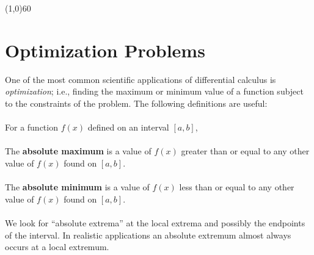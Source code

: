 \documentclass[10.5pt,twoside]{report}
\theoremstyle{definition}
\begin{document}
\line(1,0){60}
\linethickness{0.5mm}

\pagebreak





\section{Optimization Problems}\label{Optimization Problems}

One of the most common scientific applications of differential calculus is \textit{optimization}; i.e., finding the maximum or minimum value of a function subject to the constraints of the problem.  The following definitions are useful:\\
${}$\\
For a function $f(x)$ defined on an interval $[a,b]$,\\
\verb|   |\\
The \textbf{absolute maximum} is a value of $f(x)$ greater than or equal to any other value of $f(x)$ found on $[a,b]$.\\
\verb|   |\\
The \textbf{absolute minimum} is a value of $f(x)$ less than or equal to any other value of $f(x)$ found on $[a,b]$.\\
\verb|   |\\
We look for ``absolute extrema'' at the local extrema and possibly the endpoints of the interval.  In realistic applications an absolute extremum almost always occurs at a local extremum.
\end{document}

